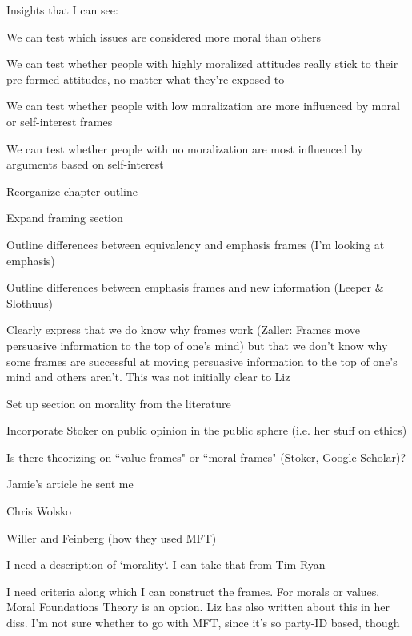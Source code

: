 \begin{coi}
\begin{coi}
				\item Insights that I can see:
					\begin{coi}
						\item We can test which issues are considered more moral than others 
						\item We can test whether people with highly moralized attitudes really stick to their pre-formed attitudes, no matter what they're exposed to 
						\item We can test whether people with low moralization are more influenced by moral or self-interest frames 
						\item We can test whether people with no moralization are most influenced by arguments based on self-interest 
					\end{coi}
			\end{coi}
		\item Reorganize chapter outline
		\item Expand framing section
			\begin{coi}
				\item Outline differences between equivalency and emphasis frames (I'm looking at emphasis)
				\item Outline differences between emphasis frames and new information (Leeper \& Slothuus)
				\item Clearly express that we do know why frames work (Zaller: Frames move persuasive information to the top of one's mind) but that we don't know why some frames are successful at moving persuasive information to the top of one's mind and others aren't. This was not initially clear to Liz
			\end{coi}
		\item Set up section on morality from the literature
			\begin{coi}
				\item Incorporate Stoker on public opinion in the public sphere (i.e. her stuff on ethics)
				\item Is there theorizing on ``value frames" or ``moral frames" (Stoker, Google Scholar)?
				\item Jamie's article he sent me
				\item Chris Wolsko
				\item Willer and Feinberg (how they used MFT)
				\item I need a description of `morality`. I can take that from Tim Ryan
				\item I need criteria along which I can construct the frames. For morals or values, Moral Foundations Theory is an option. Liz has also written about this in her diss. I'm not sure whether to go with MFT, since it's so party-ID based, though

\end{coi}
\end{coi}
